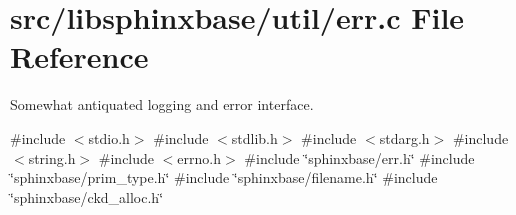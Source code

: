 \section{src/libsphinxbase/util/err.c File Reference}
\label{err_8c}


Somewhat antiquated logging and error interface.  


{\ttfamily \#include $<$stdio.\+h$>$}\newline
{\ttfamily \#include $<$stdlib.\+h$>$}\newline
{\ttfamily \#include $<$stdarg.\+h$>$}\newline
{\ttfamily \#include $<$string.\+h$>$}\newline
{\ttfamily \#include $<$errno.\+h$>$}\newline
{\ttfamily \#include \char`\"{}sphinxbase/err.\+h\char`\"{}}\newline
{\ttfamily \#include \char`\"{}sphinxbase/prim\+\_\+type.\+h\char`\"{}}\newline
{\ttfamily \#include \char`\"{}sphinxbase/filename.\+h\char`\"{}}\newline
{\ttfamily \#include \char`\"{}sphinxbase/ckd\+\_\+alloc.\+h\char`\"{}}\newline
